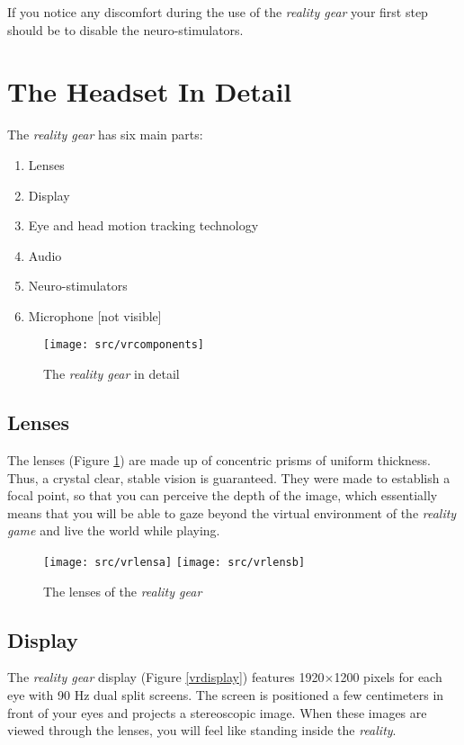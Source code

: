 If you notice any discomfort during the use of the \emph{\poke{} reality gear} your first step should be to disable the neuro-stimulators.

\newpage
\section{The Headset In Detail}

The \emph{\poke{} reality gear} has six main parts:
\begin{enumerate}
\setlength\itemsep{.05em}
\item Lenses
\item Display
\item Eye and head motion tracking technology
\item Audio
\item Neuro-stimulators 
\item Microphone [not visible]
\end{enumerate}

\begin{figure}[!ht]
\begin{center}
\texttt{[image: src/vrcomponents]}
\end{center}
\caption[The \emph{\pokeT{} reality gear} in detail]{The \emph{\poke{} reality gear} in detail}
\end{figure}

\subsection{Lenses} 
The lenses (Figure \ref{vrlens}) are made up of concentric prisms of uniform thickness. Thus, a crystal clear, stable vision is guaranteed. They were made to establish a focal point, so that you can perceive the depth of the image, which essentially means that you will be able to gaze beyond the virtual environment of the \emph{\poke{} reality game} and live the world while playing.

\begin{figure}[!ht]
\begin{center}
\texttt{[image: src/vrlensa]}
\texttt{[image: src/vrlensb]}
\end{center}
\caption[The lenses of the \emph{\pokeT{} reality gear}]{The lenses of the \emph{\poke{} reality gear}}
\label{vrlens}
\end{figure}

\subsection{Display}
The \emph{\poke{} reality gear} display (Figure \ref{vrdisplay}) features 1920$\times$1200 pixels for each eye with 90 Hz dual split screens. The screen is positioned a few centimeters in front of your eyes and projects a stereoscopic image. When these images are viewed through the lenses, you will feel like standing inside the \emph{\poke{} reality}.

